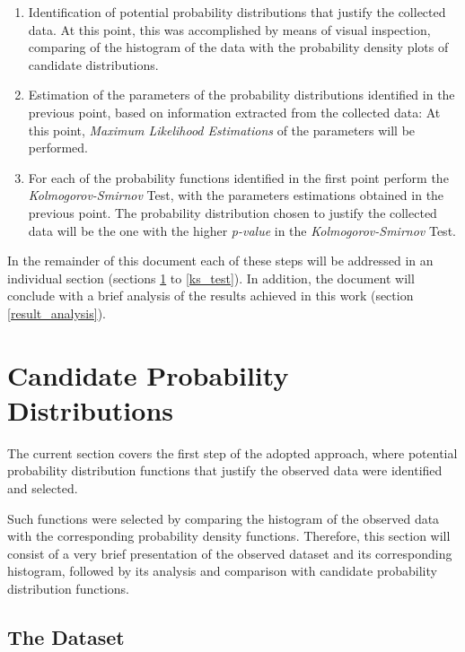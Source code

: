 \documentclass[12pt]{article}
\begin{document}
\begin{enumerate}
	\item Identification of potential probability distributions that justify the collected data. At this point, this was accomplished by means of visual inspection, comparing of the histogram of the data with the probability density plots of candidate distributions.
	
	\item Estimation of the parameters of the probability distributions identified in the previous point, based on information extracted from the collected data: At this point, \emph{Maximum Likelihood Estimations} of the parameters will be performed.
	
	\item For each of the probability functions identified in the first point perform the \emph{Kolmogorov-Smirnov} Test, with the parameters estimations obtained in the previous point. The probability distribution chosen to justify the collected data will be the one with the higher \emph{p-value} in the \emph{Kolmogorov-Smirnov} Test.
\end{enumerate}

In the remainder of this document each of these steps will be addressed in an individual section (sections \ref{candidate_distributions} to \ref{ks_test}). In addition, the document will conclude with a brief analysis of the results achieved in this work (section \ref{result_analysis}).

\section{Candidate Probability Distributions}
\label{candidate_distributions}

The current section covers the first step of the adopted approach, where potential probability distribution functions that justify the observed data were identified and selected.

Such functions were selected by comparing the histogram of the observed data with the corresponding probability density functions. Therefore, this section will consist of a very brief presentation of the observed dataset and its corresponding histogram, followed by its analysis and comparison with candidate probability distribution functions.

\subsection{The Dataset}
\end{document}

